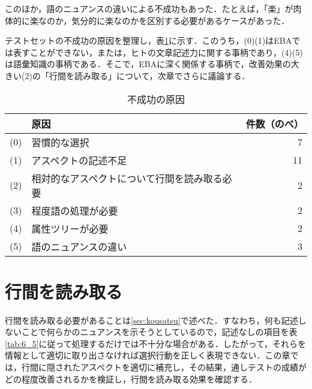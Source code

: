 \documentclass[japanese]{jnlp_1.3a}
\begin{document}
このほか，語のニュアンスの違いによる不成功もあった．たとえば，「楽」が肉体的に楽なのか，気分的に楽なのかを区別する必要があるケースがあった．

テストセットの不成功の原因を整理し，表\ref{tab:6_9}に示す．このうち，(0)(1)はEBAでは表すことができない，または，ヒトの文章記述力に関する事柄であり，(4)(5)は語彙知識の事柄である．そこで，EBAに深く関係する事柄で，改善効果の大きい(2)の「行間を読み取る」について，次章でさらに議論する．

\begin{table}[t]
  \caption{不成功の原因}
  \begin{center}
    \begin{tabular}{c l r} \hline
	    & 原因 & 件数（のべ）\\ \hline
	(0) & 習慣的な選択                                 &  7 \\
	(1) & アスペクトの記述不足                         & 11 \\
	(2) & 相対的なアスペクトについて行間を読み取る必要 &  2 \\
	(3) & 程度語の処理が必要                           &  2 \\
	(4) & 属性ツリーが必要                             &  2 \\
	(5) & 語のニュアンスの違い                         &  3 \\ \hline
    \end{tabular}
    \label{tab:6_9}
  \end{center}
\end{table}

\section{行間を読み取る}
\label{sec:gyoukan}

行間を読み取る必要があることは\ref{sec:kousatsu}で述べた．すなわち，何も記述しないことで何らかのニュアンスを示そうとしているので，記述なしの項目を表\ref{tab:6_5}に従って処理するだけでは不十分な場合がある．したがって，それらを情報として適切に取り出さなければ選択行動を正しく表現できない．この章では，行間に隠されたアスペクトを適切に補充し，その結果，通しテストの成績がどの程度改善されるかを検証し，行間を読み取る効果を確認する．
\end{document}
